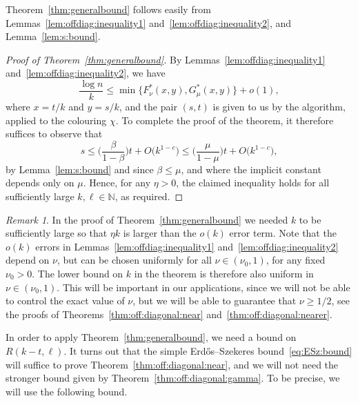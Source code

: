 \documentclass[12pt,reqno]{amsart}
\theoremstyle{definition}
\theoremstyle{remark}
\newtheorem{remark}[theorem]{Remark}
\newcommand\N{\mathbb{N}}
\renewcommand{\le}{\leqslant}
\renewcommand{\ge}{\geqslant}
\def\N{\mathbb{N}}
\begin{document}
Theorem~\ref{thm:generalbound} follows easily from Lemmas~\ref{lem:offdiag:inequality1} and~\ref{lem:offdiag:inequality2}, and Lemma~\ref{lem:s:bound}.

\begin{proof}[Proof of Theorem~\ref{thm:generalbound}]
By Lemmas~\ref{lem:offdiag:inequality1} and~\ref{lem:offdiag:inequality2}, we have 
$$\frac{\log n}{k} \le \min \big\{ F^*_\nu(x,y), G^*_\mu(x,y) \big\} + o(1),$$
where $x = t/k$ and $y = s/k$, and the pair $(s,t)$ is given to us by the algorithm, applied to the colouring $\chi$. To complete the proof of the theorem, it therefore suffices to observe that 
$$s \le \bigg( \frac{\beta}{1 - \beta} \bigg) t + O\big( k^{1-c} \big) \le \bigg( \frac{\mu}{1 - \mu} \bigg) t + O\big( k^{1-c} \big),$$ 
by Lemma~\ref{lem:s:bound} and since $\beta \le \mu$, and where the implicit constant depends only on $\mu$. Hence, for any $\eta > 0$, the claimed inequality holds for all sufficiently large $k,\ell \in \N$, as required.
\end{proof}

\begin{remark}\label{rmk:uniform:nu}
In the proof of Theorem~\ref{thm:generalbound} we needed $k$ to be sufficiently large so that $\eta k$ is larger than the $o(k)$ error term. Note that the $o(k)$ errors in Lemmas~\ref{lem:offdiag:inequality1} and~\ref{lem:offdiag:inequality2} depend on $\nu$, but can be chosen uniformly for all $\nu \in (\nu_0,1)$, for any fixed $\nu_0 > 0$. The lower bound on $k$ in the theorem is therefore also uniform in $\nu \in (\nu_0,1)$. This will be important in our applications, since we will not be able to control the exact value of $\nu$, but we will be able to guarantee that $\nu \ge 1/2$, see the proofs of Theorems~\ref{thm:off:diagonal:near} and~\ref{thm:off:diagonal:nearer}. 
\end{remark}

In order to apply Theorem~\ref{thm:generalbound}, we need a bound on $R(k-t,\ell)$. It turns out that %
the simple Erd\H{o}s--Szekeres bound~\eqref{eq:ESz:bound} will suffice to prove Theorem~\ref{thm:off:diagonal:near}, and we will not need the stronger bound given by Theorem~\ref{thm:off:diagonal:gamma}. To be precise, we will use the following bound. %

\end{document}
